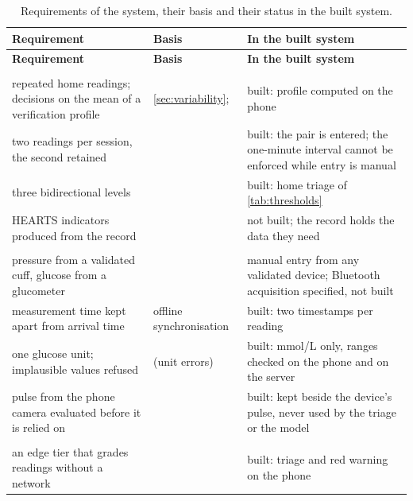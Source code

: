 {\footnotesize
\begin{longtable}{@{}>{\raggedright\arraybackslash}p{4.9cm} >{\raggedright\arraybackslash}p{3.2cm} >{\raggedright\arraybackslash}p{5.5cm}@{}}
\caption{Requirements of the system, their basis and their status in the built system.}\label{tab:requirements}\\
\toprule
\textbf{Requirement} & \textbf{Basis} & \textbf{In the built system} \\
\midrule
\endfirsthead
\toprule
\textbf{Requirement} & \textbf{Basis} & \textbf{In the built system} \\
\midrule
\endhead
\multicolumn{3}{@{}l}{\textit{Measurement}} \\
repeated home readings; decisions on the mean of a verification profile & \cref{sec:variability}; \textcite{mihevc2025} & built: profile computed on the phone \\
two readings per session, the second retained & \textcite{mihevc2025} & built: the pair is entered; the one-minute interval cannot be enforced while entry is manual \\
three bidirectional levels & \textcite{mihevc2025} & built: home triage of \cref{tab:thresholds} \\
HEARTS indicators produced from the record & \textcite{who2023hypertension} & not built; the record holds the data they need \\
\addlinespace
\multicolumn{3}{@{}l}{\textit{Acquisition}} \\
pressure from a validated cuff, glucose from a glucometer & \textcite{who2023hypertension,alhaddad2022} & manual entry from any validated device; Bluetooth acquisition specified, not built \\
measurement time kept apart from arrival time & offline synchronisation & built: two timestamps per reading \\
one glucose unit; implausible values refused & \textcite{liu2025review} (unit errors) & built: mmol/L only, ranges checked on the phone and on the server \\
pulse from the phone camera evaluated before it is relied on & \textcite{liu2025ppg,alessa2019} & built: kept beside the device's pulse, never used by the triage or the model \\
\addlinespace
\multicolumn{3}{@{}l}{\textit{Architecture}} \\
an edge tier that grades readings without a network & \textcite{mucchi2021,segun2025} & built: triage and red warning on the phone \\

\end{longtable}}
